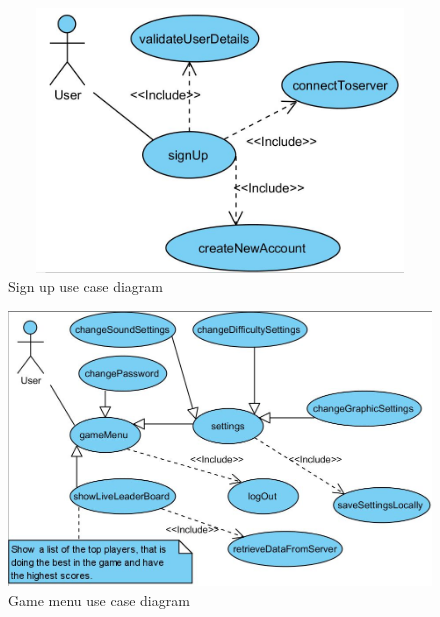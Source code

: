 \documentclass[letterpaper]{article}
\begin{document}
		\begin{figure}[ht!]
		\centering
		\includegraphics[width=180mm, height=70mm]{UML_Diagram/Use_Case/signup}
		\caption{Sign up use case diagram}
		\label{overflow}
		\end{figure}
		
		\vspace{0.2in}
		
		\begin{figure}[H]
		\centering
		\includegraphics[width=180mm]{UML_Diagram/Use_Case/game_menu}
		\caption{Game menu use case diagram}
		\label{overflow}
		\end{figure}
		
		\section*{\colorbox{black}{}} 
		\vspace{0.2in}
		
\end{document}
